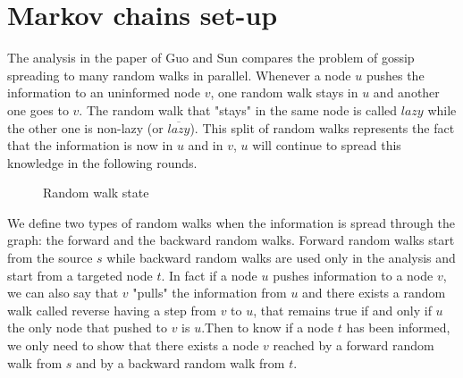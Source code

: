 \documentclass[10pt,journal,a4paper]{IEEEtran}
\begin{document}
\section{Markov chains set-up}

The analysis in the paper of Guo and Sun \cite{GuoSun} compares the problem of gossip spreading to many random walks in parallel. Whenever a node $u$ pushes the information to an uninformed node $v$, one random walk stays in $u$ and another one goes to $v$. The random walk that "stays" in the same node is called $lazy$ while the other one is non-lazy (or $\overline{lazy}$). This split of random walks represents the fact that the information is now in $u$ and in $v$, $u$ will continue to spread this knowledge in the following rounds.

\begin{figure}[h]
\centering
{}
\caption{Random walk state}
\label{fig:lazyFSM}
\end{figure}

We define two types of random walks when the information is spread through the graph: the forward and the backward random walks. Forward random walks start from the source $s$ while backward random walks are used only in the analysis and start from a targeted node $t$. In fact if a node $u$ pushes information to a node $v$, we can also say that $v$ "pulls" the information from $u$ and there exists a random walk called reverse having a step from $v$ to $u$, that remains true if and only if $u$ the only node that pushed to $v$ is $u$.Then to know if a node $t$ has been informed, we only need to show that there exists a node $v$ reached by a forward random walk from $s$ and by a backward random walk from $t$.
\end{document}

